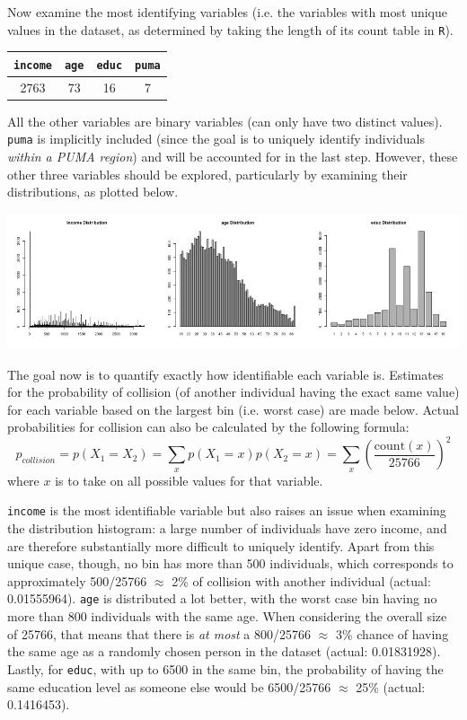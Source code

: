 \documentclass[12pt]{article}
\begin{document}
Now examine the most identifying variables (i.e. the variables with most unique values in the dataset, as determined by taking the length of its count table in \texttt{R}).
\begin{center}
\begin{tabular}{||c|c|c|c||}
\hline
\texttt{income} & \texttt{age} & \texttt{educ} & \texttt{puma} \\\hline
2763 & 73 & 16 & 7 \\ \hline
\end{tabular}
\end{center}
All the other variables are binary variables (can only have two distinct values). \texttt{puma} is implicitly included (since the goal is to uniquely identify individuals \emph{within a PUMA region}) and will be accounted for in the last step. However, these other three variables should be explored, particularly by examining their distributions, as plotted below.

\begin{center}
\includegraphics[width=\textwidth]{figs/exploredist}
\end{center}

The goal now is to quantify exactly how identifiable each variable is. Estimates for the probability of collision (of another individual having the exact same value) for each variable based on the largest bin (i.e. worst case) are made below. Actual probabilities for collision can also be calculated by the following formula:
\[p_{collision}=p(X_1 = X_2) = \sum\limits_{x} p(X_1 = x)p(X_2=x) = \sum\limits_x \left(\dfrac{\text{count}(x)}{25766}\right)^2\]
where $x$ is to take on all possible values for that variable.

\texttt{income} is the most identifiable variable but also raises an issue when examining the distribution histogram: a large number of individuals have zero income, and are therefore substantially more difficult to uniquely identify. Apart from this unique case, though, no bin has more than 500 individuals, which corresponds to approximately 500/25766 $\approx$ 2\% of collision with another individual (actual: {0.01555964}). \texttt{age} is distributed a lot better, with the worst case bin having no more than 800 individuals with the same age. When considering the overall size of 25766, that means that there is \emph{at most} a 800/25766 $\approx$ 3\% chance of having the same age as a randomly chosen person in the dataset (actual: {0.01831928}). Lastly, for \texttt{educ}, with up to 6500 in the same bin, the probability of having the same education level as someone else would be 6500/25766 $\approx$ 25\% (actual: {0.1416453}).
\end{document}
